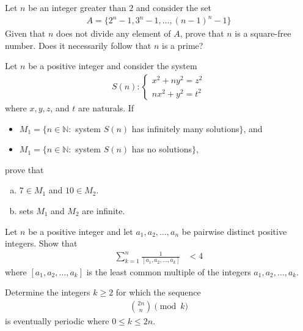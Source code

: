 \begin{problem}
	Let $n$ be an integer greater than $2$ and consider the set
	\begin{align*}
		A = \{2^n-1,3^n-1,\dots,(n-1)^n-1\}
	\end{align*}
	Given that $n$ does not divide any element of $A$, prove that $n$ is a square-free number. Does it necessarily follow that $n$ is a prime? %
\end{problem}

\begin{problem}
	Let $n$ be a positive integer and consider the system
	\begin{align*}
		S(n):\begin{cases}
			x^2+ny^2=z^2\\
			nx^2+y^2=t^2
		\end{cases}
	\end{align*}
	where $x,y,z$, and $t$ are naturals. If
	\begin{itemize}
		\item $M_1=\{n\in\mathbb N:$ system $S(n)$ has infinitely many solutions$\}$, and
		\item $M_1=\{n\in\mathbb N:$ system $S(n)$ has no solutions$\}$,
	\end{itemize}
	prove that
	\begin{enumerate}[(a)]
		\item $7 \in M_1$ and $10 \in M_2$.
		\item sets $M_1$ and $M_2$ are infinite.
	\end{enumerate}
\end{problem}

\begin{problem}
	Let $n$ be a positive integer and let $a_1, a_2, \dots, a_n$ be pairwise distinct positive integers. Show that
	\begin{align*}
		\sum_{k=1}^{n} \frac{1}{[a_1, a_2, \dots, a_k]}
			& < 4
	\end{align*}
	where $[a_1, a_2, \dots, a_k]$ is the least common multiple of the integers $a_1, a_2, \dots, a_k$.
\end{problem}

\begin{problem}
	Determine the integers $k \geq 2$ for which the sequence
		\begin{align*}
			\binom{2n}{n} \pmod k
		\end{align*}
	is eventually periodic where $0\leq k\leq 2n$.
\end{problem}

